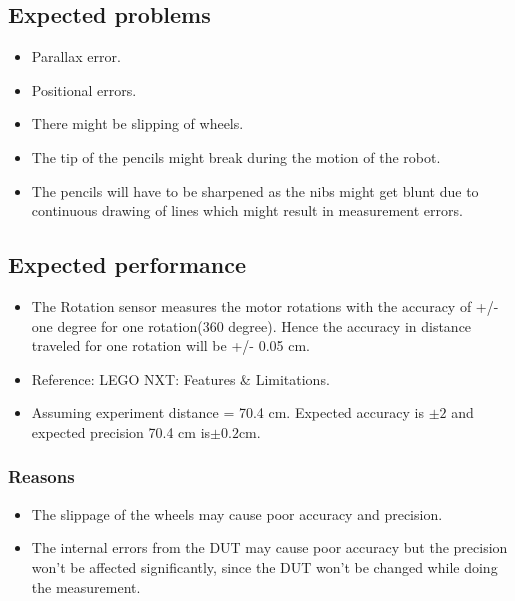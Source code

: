 \documentclass[11pt,a4paper]{article}
\begin{document}
	\subsection{\textbf{Expected problems}}
	\begin{itemize}
		\item Parallax error.
		\item Positional errors.
		\item There might be slipping of wheels.
		\item The tip of the pencils might break during the motion of the robot.
		\item The pencils will have to be sharpened as the nibs might get blunt due to continuous drawing of lines which might result in measurement errors.
	\end{itemize}
	
	\subsection{\textbf{Expected performance}}
	\begin{itemize}
		\item The Rotation sensor measures the motor rotations with the accuracy of +/- one degree for one rotation(360 degree). Hence the accuracy in distance traveled for one rotation will be +/- 0.05 cm. 
		\item Reference: LEGO NXT: Features \& Limitations.
		\item Assuming experiment distance = 70.4 cm. Expected accuracy is $ \pm 2$ and expected precision 70.4 cm is$ \pm 0.2$cm.
	\end{itemize}
	
	\subsubsection{Reasons}
	\begin{itemize}
		\item The slippage of the wheels may cause poor accuracy and precision.
		\item The internal errors from the DUT may cause poor accuracy but the precision won't be affected significantly, since the DUT won't be changed while doing the measurement.
	\end{itemize}
	
\end{document}
